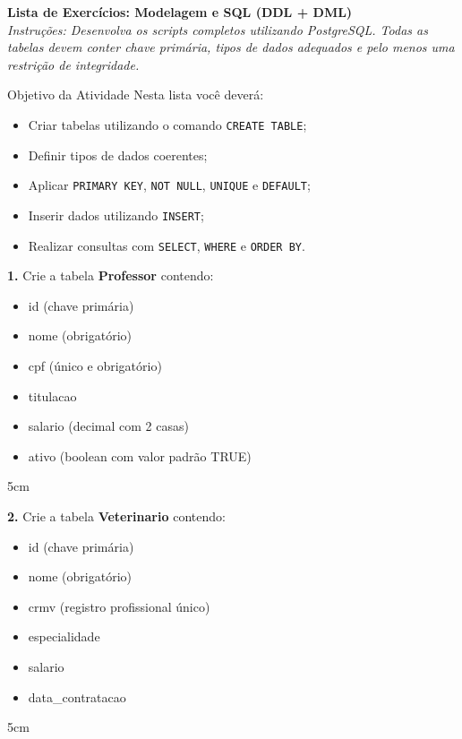 \documentclass[12pt]{article}
\begin{document}

\vspace*{0.2cm}

\begin{center}
  {\Large \textbf{Lista de Exercícios: Modelagem e SQL (DDL + DML)}}\\[0.2cm]
  \textit{Instruções: Desenvolva os scripts completos utilizando PostgreSQL. Todas as tabelas devem conter chave primária, tipos de dados adequados e pelo menos uma restrição de integridade.}
\end{center}

\vspace{0.4cm}

\begin{block}{Objetivo da Atividade}
Nesta lista você deverá:
\begin{itemize}
    \item Criar tabelas utilizando o comando \texttt{CREATE TABLE};
    \item Definir tipos de dados coerentes;
    \item Aplicar \texttt{PRIMARY KEY}, \texttt{NOT NULL}, \texttt{UNIQUE} e \texttt{DEFAULT};
    \item Inserir dados utilizando \texttt{INSERT};
    \item Realizar consultas com \texttt{SELECT}, \texttt{WHERE} e \texttt{ORDER BY}.
\end{itemize}
\end{block}

\vspace{0.5cm}

\textbf{1.} Crie a tabela \textbf{Professor} contendo:
\begin{itemize}
    \item id (chave primária)
    \item nome (obrigatório)
    \item cpf (único e obrigatório)
    \item titulacao
    \item salario (decimal com 2 casas)
    \item ativo (boolean com valor padrão TRUE)
\end{itemize}
\begin{resposta}{5cm}
\end{resposta}

\vspace{0.5cm}

\textbf{2.} Crie a tabela \textbf{Veterinario} contendo:
\begin{itemize}
    \item id (chave primária)
    \item nome (obrigatório)
    \item crmv (registro profissional único)
    \item especialidade
    \item salario
    \item data\_contratacao
\end{itemize}
\begin{resposta}{5cm}
\end{resposta}
\end{document}

